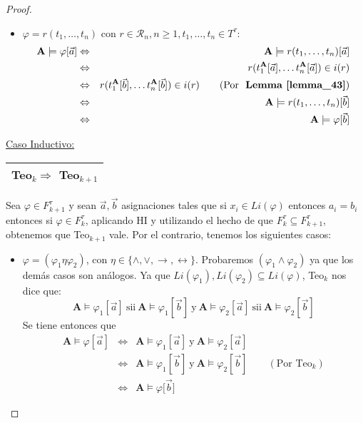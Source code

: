 \begin{proof}
\begin{itemize}
        \item $\varphi = r(t_{1}, \dotsc, t_{n})$ con $r \in \mathcal{R}_{n}, n \geq 1, t_{1}, \dotsc, t_{n} \in
          T^{\tau}$:
          \begin{eqnarray*}
            \mathbf{A} \models \varphi[\vec{a}] &\Leftrightarrow& \mathbf{A} \models r(t_{1}, \dotsc, t_{n})[\vec{a}] \\
            &\Leftrightarrow& r(t_{1}^{\mathbf{A}}[\vec{a}], \dotsc t_{n}^{\mathbf{A}}[\vec{a}]) \in i(r) \\
            &\Leftrightarrow& r(t_{1}^{\mathbf{A}}[\vec{b}], \dotsc t_{n}^{\mathbf{A}}[\vec{b}]) \in i(r) \qquad
              (\text{Por} \ \textbf{Lemma~\ref{lemma_43}}) \\
            &\Leftrightarrow& \mathbf{A} \models r(t_{1}, \dotsc, t_{n})[\vec{b}] \\
            &\Leftrightarrow& \mathbf{A} \models \varphi[\vec{b}]
          \end{eqnarray*}
      \end{itemize}

  		\PN \underline{Caso Inductivo:} \begin{tabular}{|c|} \hline Teo$_{k} \Rightarrow$ Teo$_{k + 1}$ \\\hline
      \end{tabular} Sea $\varphi \in F_{k+1}^{\tau}$ y sean $\vec{a}, \vec{b}$ asignaciones tales que si $x_{i} \in
      Li(\varphi)$ entonces $a_{i} = b_{i}$ entonces si $\varphi \in F_{k}^{\tau}$, aplicando HI y utilizando el hecho
      de que $F_{k}^{\tau} \subseteq F_{k+1}^{\tau}$, obtenemos que Teo$_{k+1}$ vale. Por el contrario, tenemos los
      siguientes casos:
      \begin{itemize}
        \item $\varphi = (\varphi_{1} \eta \varphi_{2})$, con $\eta \in \{\wedge, \vee, \rightarrow, \leftrightarrow\}$.
        Probaremos $(\varphi_{1} \wedge \varphi_{2})$ ya que los demás casos son análogos. Ya que $Li(\varphi_{1}),
        Li(\varphi_{2}) \subseteq Li(\varphi)$, Teo$_{k}$ nos dice que:
        \[
          \mathbf{A} \models \varphi_{1}[\vec{a}] \ \text{sii} \ \mathbf{A} \models \varphi_{1}[\vec{b}] \ \text{y} \
          \mathbf{A} \models \varphi_{2}[\vec{a}] \ \text{sii} \ \mathbf{A} \models \varphi_{2}[\vec{b}]
        \]
        \PN Se tiene entonces que
        \begin{eqnarray*}
          \mathbf{A} \models \varphi[\vec{a}] &\Leftrightarrow& \mathbf{A} \models \varphi_{1}[\vec{a}] \ \text{y} \
            \mathbf{A} \models \varphi_{2}[\vec{a}] \\
          &\Leftrightarrow& \mathbf{A} \models \varphi_{1}[\vec{b}] \ \text{y} \ \mathbf{A} \models \varphi_{2}[\vec{b}]
            \qquad (\text{Por Teo}_{k}) \\
          &\Leftrightarrow& \mathbf{A} \models \varphi \lbrack \vec{b}]
        \end{eqnarray*}


\end{itemize}
\end{proof}
